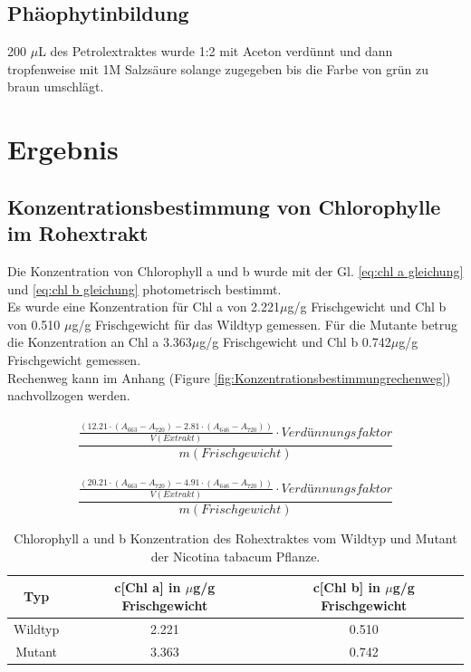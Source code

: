 \documentclass[10pt,a4paper]{article}
\begin{document}
		\subsection{Phäophytinbildung}
		
		200 $\mu$L des Petrolextraktes wurde 1:2 mit Aceton verdünnt und dann tropfenweise mit 1M Salzsäure solange zugegeben bis die Farbe von grün zu braun umschlägt.
	
	\section{Ergebnis}
		\subsection{Konzentrationsbestimmung von Chlorophylle im Rohextrakt}
		Die Konzentration von Chlorophyll a und b wurde mit der Gl. \ref{eq:chl a gleichung} und \ref*{eq:chl b gleichung} photometrisch bestimmt.\\
		Es wurde eine Konzentration für Chl a von 2.221$\mu$g/g Frischgewicht und Chl b  von 0.510 $\mu$g/g Frischgewicht für das Wildtyp gemessen. Für die Mutante betrug die Konzentration an Chl a 3.363$\mu$g/g Frischgewicht und Chl b 0.742$\mu$g/g Frischgewicht gemessen.\\
		Rechenweg kann im Anhang (Figure  \ref{fig:Konzentrationsbestimmungrechenweg}) nachvollzogen werden.\\
		\\
		\begin{equation}\label{eq:chl a gleichung}
			\frac{\frac{(12.21 \cdot (A_{663} - A_{720}) - 2.81 \cdot (A_{646} - A_{720}))}{V(Extrakt)} \cdot Verdünnungsfaktor}{m(Frischgewicht)}
		\end{equation}
		\\
		\begin{equation}\label{eq:chl b gleichung}
			\frac{\frac{(20.21 \cdot (A_{663} - A_{720}) - 4.91 \cdot (A_{646} - A_{720}))}{V(Extrakt)} \cdot Verdünnungsfaktor}{m(Frischgewicht)}
		\end{equation}
		
			\begin{table}[H]
				\centering
				\caption{Chlorophyll a und b Konzentration des Rohextraktes vom Wildtyp und Mutant der Nicotina tabacum Pflanze.}
				\label{tab:konzentration chl a und b}
				\begin{tabular}{ccc}
					\toprule
					Typ&c[Chl a] in $\mu$g/g Frischgewicht & c[Chl b] in $\mu$g/g Frischgewicht\\
					\midrule
					Wildtyp& 2.221 & 0.510\\
					Mutant & 3.363 & 0.742\\
					\bottomrule
				\end{tabular}
			\end{table}	
		
\end{document}
